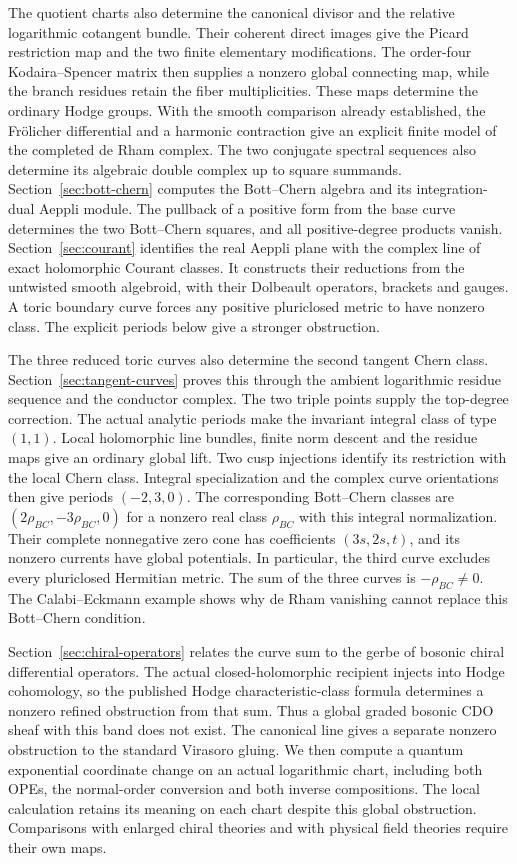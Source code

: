 \documentclass[11pt]{article}
\numberwithin{equation}{section}
\begin{document}
The quotient charts also determine the canonical divisor and the
relative logarithmic cotangent bundle. Their coherent direct images
give the Picard restriction map and the two finite elementary
modifications. The order-four Kodaira--Spencer matrix then supplies
a nonzero global connecting map, while the branch residues retain
the fiber multiplicities. These maps determine the ordinary Hodge
groups. With the smooth comparison already established, the
Fr\"olicher differential and a harmonic contraction give an explicit
finite model of the completed de Rham complex.
The two conjugate spectral sequences also determine its algebraic
double complex up to square summands. Section~\ref{sec:bott-chern}
computes the Bott--Chern algebra and its integration-dual Aeppli module.
The pullback of a positive form from the base curve determines
the two Bott--Chern squares, and all positive-degree products vanish.
Section~\ref{sec:courant} identifies the real Aeppli plane with
the complex line of exact holomorphic Courant classes.
It constructs their reductions from the untwisted smooth
algebroid, with their Dolbeault operators, brackets and gauges.
A toric boundary curve forces any positive pluriclosed metric
to have nonzero class. The explicit periods below give a stronger
obstruction.

The three reduced toric curves also determine the second tangent
Chern class. Section~\ref{sec:tangent-curves} proves this through
the ambient logarithmic residue sequence and the conductor complex.
The two triple points supply the top-degree correction.
The actual analytic periods make the invariant integral class
of type $(1,1)$. Local holomorphic line bundles, finite norm
descent and the residue maps give an ordinary global lift.
Two cusp injections identify its restriction with the local
Chern class. Integral specialization and the complex curve
orientations then give periods $(-2,3,0)$.
The corresponding Bott--Chern classes are
$(2\rho_{BC},-3\rho_{BC},0)$ for a nonzero real class
$\rho_{BC}$ with this integral normalization.
Their complete nonnegative zero cone has coefficients
$(3s,2s,t)$, and its nonzero currents have global potentials.
In particular, the third curve excludes every pluriclosed
Hermitian metric. The sum of the three curves is
$-\rho_{BC}\ne0$.
The Calabi--Eckmann example shows why de Rham vanishing cannot
replace this Bott--Chern condition.

Section~\ref{sec:chiral-operators} relates the curve sum to the
gerbe of bosonic chiral differential operators.
The actual closed-holomorphic recipient injects into Hodge
cohomology, so the published Hodge characteristic-class formula
determines a nonzero refined obstruction from that sum.
Thus a global graded bosonic CDO sheaf with this band does not exist.
The canonical line gives a separate nonzero obstruction to the
standard Virasoro gluing. We then compute a quantum exponential
coordinate change on an actual logarithmic chart, including
both OPEs, the normal-order conversion and both inverse compositions.
The local calculation retains its meaning on each chart despite
this global obstruction. Comparisons with enlarged chiral theories
and with physical field theories require their own maps.
\end{document}
